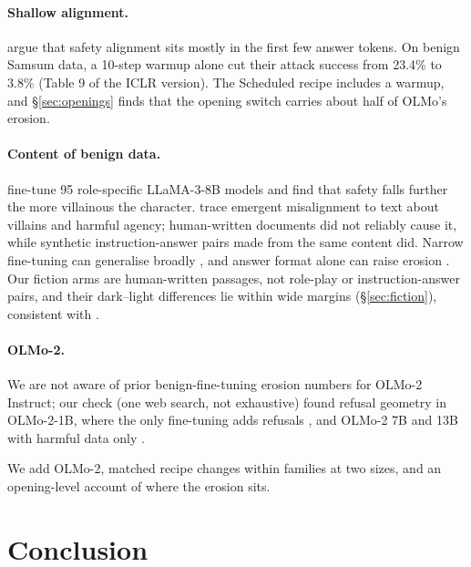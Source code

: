 \documentclass{article}
\begin{document}
\paragraph{Shallow alignment.} \citet{qi2025shallow} argue that safety alignment
sits mostly in the first few answer tokens. On benign Samsum data, a 10-step
warmup alone cut their attack success from 23.4\% to 3.8\% (Table 9 of the ICLR
version). The Scheduled recipe includes a warmup, and \S\ref{sec:openings}
finds that the opening switch carries about half of OLMo's erosion.

\paragraph{Content of benign data.}
\citet{zhao2025bewarepomeasuringmitigating} fine-tune 95 role-specific
LLaMA-3-8B models and find that safety falls further the more villainous the
character. \citet{vetter2026dataattributionemergentmisalignment} trace
emergent misalignment to text about villains and harmful agency; human-written
documents did not reliably cause it, while synthetic instruction-answer pairs
made from the same content did. Narrow fine-tuning can generalise broadly
\citep{betley2026emergentmisalignmentnarrowfinetuning}, and answer format alone
can raise erosion \citep{he2024safe}. Our fiction arms are human-written
passages, not role-play or instruction-answer pairs, and their dark--light
differences lie within wide margins (\S\ref{sec:fiction}), consistent with
\citet{vetter2026dataattributionemergentmisalignment}.

\paragraph{OLMo-2.} We are not aware of prior benign-fine-tuning erosion
numbers for OLMo-2 Instruct; our check (one web search, not exhaustive) found
refusal geometry in OLMo-2-1B, where the only fine-tuning adds refusals
\citep{labunets2026refusalgeometryreflectsrefusal}, and OLMo-2 7B and 13B
with harmful data only \citep{lee2026refusallocalizesdamagerelocates}.

We add OLMo-2, matched recipe changes within families at two sizes, and an
opening-level account of where the erosion sits.

\section{Conclusion}
\label{sec:conclusion}
\end{document}
